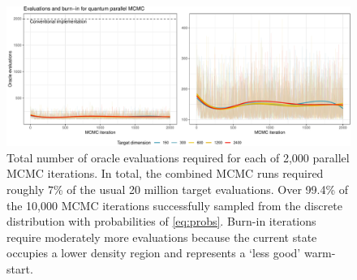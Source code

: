 \documentclass[12pt]{article} %
\begin{document}
 \begin{figure}[!t]
 	\vspace{3em}
	\centering
	\includegraphics[width=0.9\linewidth]{mcmcIterations.pdf}
	\caption{Total number of oracle evaluations required for each of 2,000 parallel MCMC iterations. In total, the combined MCMC runs required roughly $7$\% of the usual 20 million target evaluations. Over  99.4\% of the 10,000 MCMC iterations successfully sampled from the discrete distribution with probabilities of \eqref{eq:probs}. Burn-in iterations require moderately more evaluations because the current state occupies a lower density region and represents a `less good' warm-start.}\label{fig:mcmcIterations}
\end{figure}
\end{document}
